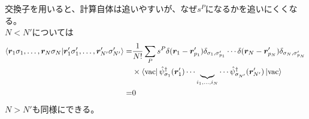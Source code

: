 \documentclass{ltjsarticle}
\begin{document}
交換子を用いると、計算自体は追いやすいが、なぜ$s^P$になるかを追いにくくなる。\\
$N<N'$については
\begin{align}
  \braket{\bm{r}_1\sigma_1,\dots,\bm{r}_N\sigma_N}{\bm{r}'_1\sigma'_1,\dots,\bm{r}'_{N'}\sigma'_{N'}}
  =&\frac{1}{N!}\sum_P s^P\delta(\bm{r}_1-\bm{r}'_{p_1})\delta_{\sigma_1,\sigma'_{p_1}}\cdots\delta(\bm{r}_N-\bm{r}'_{p_N})\delta_{\sigma_N,\sigma'_{p_N}}\\
  &\times\bra{\rm{vac}}\hat{\psi}_{\sigma_1}^\dag (\bm{r}'_1)\cdots\underbrace{}_{i_1,\dots,i_N}\cdots\hat{\psi}_{\sigma_{N'}}^\dag (\bm{r}'_{N'})\ket{\rm{vac}}\\
  =&0
\end{align}
$N>N'$も同様にできる。\\
\end{document}
